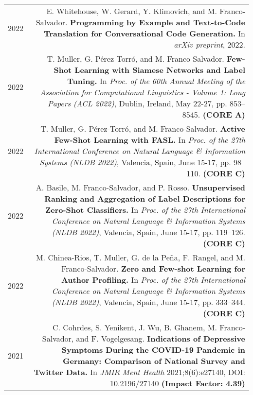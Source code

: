 \documentclass[10pt]{article}
\begin{document}
\section*{}
\begin{tabular}{L!{\VRule}R}
	2022 & E. Whitehouse, W. Gerard, Y. Klimovich, and M. Franco-Salvador. \textbf{Programming by Example and Text-to-Code Translation for Conversational Code Generation.} In \emph{arXiv preprint}, 2022. \vspace{5pt}\\
	2022 & T. Muller, G. P{\'e}rez-Torr{\'o}, and M. Franco-Salvador. \textbf{Few-Shot Learning with Siamese Networks and Label Tuning.} In \emph{Proc. of the 60th Annual Meeting of the Association for Computational Linguistics - Volume 1: Long Papers (ACL 2022)}, Dublin, Ireland, May 22-27, pp. 853--8545. \textbf{(CORE A)} \vspace{5pt}\\
    2022 & T. Muller, G. P{\'e}rez-Torr{\'o}, and M. Franco-Salvador. \textbf{Active Few-Shot Learning with FASL.}
	In \emph{Proc. of the 27th International Conference on Natural Language \& Information Systems (NLDB 2022)}, Valencia, Spain, June 15-17, pp.  98--110. \textbf{(CORE C)} \vspace{5pt}\\
	2022 & A. Basile, M. Franco-Salvador, and P. Rosso. \textbf{Unsupervised Ranking and Aggregation of Label Descriptions for Zero-Shot Classifiers.}
	In \emph{Proc. of the 27th International Conference on Natural Language \& Information Systems (NLDB 2022)}, Valencia, Spain, June 15-17, pp. 119--126. \textbf{(CORE C)} \vspace{5pt}\\
	2022 & M. Chinea-Rios, T. Muller, G. de la Pe\~{n}a, F. Rangel, and M. Franco-Salvador. \textbf{Zero and Few-shot Learning for Author Profiling.}
	In \emph{Proc. of the 27th International Conference on Natural Language \& Information Systems (NLDB 2022)}, Valencia, Spain, June 15-17, pp. 333--344. \textbf{(CORE C)} \vspace{5pt}\\
    2021 & C. Cohrdes, S. Yenikent, J. Wu, B. Ghanem, M. Franco-Salvador, and F. Vogelgesang. \textbf{Indications of Depressive Symptoms During the COVID-19 Pandemic in Germany: Comparison of National Survey and Twitter Data.}
	In \emph{JMIR Ment Health} 2021;8(6):e27140, DOI: \href{https://doi.org/10.2196/27140}{10.2196/27140} \textbf{(Impact Factor: 4.39)} \vspace{5pt}\\

\end{tabular}
\end{document}
